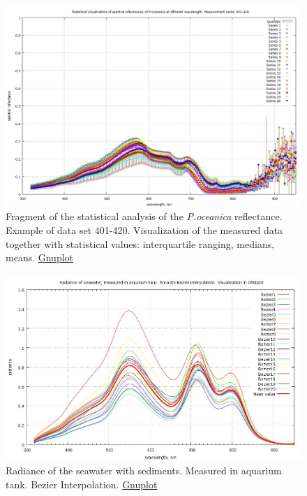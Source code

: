 \documentclass[10pt, a4paper]{article}
\begin{document}
\begin{appendices}
\begin{figure}[h]
	\begin{center}
	\includegraphics[scale=0.20]{GNU-Stat-M-401-420.jpg}
	\caption{Fragment of the statistical analysis of the \textit{P.oceanica} reflectance. Example of data set 401-420. 
		Visualization of the measured data together with statistical values: interquartile ranging, medians, means. \href{http://www.gnuplot.info/}{Gnuplot}}
	\label{fig:A.15}
	\end{center}
\end{figure}

\begin{figure}[H]
	\centering
	\includegraphics[scale=0.25]{GNU-Radiance_Bezier.jpg}
	\caption{Radiance of the seawater with sediments. Measured in aquarium tank. Bezier Interpolation. \href{http://www.gnuplot.info/}{Gnuplot}}
	\label{fig:A.16}
\end{figure}


\end{appendices}
\end{document}
